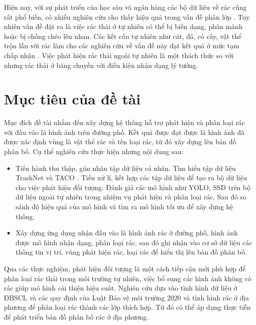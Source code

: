 \documentclass[../the.tex]{subfiles}
\begin{document}
\bigskip

{\fontsize{13}{12} \selectfont 

Hiện nay, với sự phát triển của học sâu và ngân hàng các bộ dữ liệu về rác cũng rất phổ biến, có nhiều nghiên cứu cho thấy hiệu quả trong vấn đề phân lớp \cite{yang2016classification} \cite{shah2022method} \cite{ahmad2020intelligent}. 
Tuy nhiên vấn đề đặt ra là việc rác thải ở tự nhiên có thể bị biến dạng, phân mảnh hoặc bị chồng chéo lên nhau.
Các kết cấu tự nhiên như cát, đá, cỏ cây, vật thể trộn lẫn với rác làm cho các nghiên cứu về vấn đề này đạt kết quả ở mức tạm chấp nhận \cite{Majchrowska_2022} \cite{9122693} \cite{8793975} \cite{proença2020taco}.
Việc phát hiện rác thải ngoài tự nhiên là một thách thức so với nhưng rác thải ở băng chuyền với điều kiện nhận dạng lý tưởng.

}


\section{Mục tiêu của đề tài}
\label{muc_tieu}


{\fontsize{13}{12} \selectfont

Mục đích đề tài nhắm đến xây dựng hệ thống hỗ trợ phát hiện và phân loại rác với đầu vào là hình ảnh trên đường phố. Kết quả được đạt được là hình ảnh đã được xác định vùng là vật thể rác và tên loại rác, từ đó xây dựng lên bản đồ phân bố. Cụ thể nghiên cứu thực hiện nhưng nội dung sau:

\begin{itemize}
  \item Tiến hành thu thập, gán nhãn tập dữ liệu cá nhân. Tìm hiểu tập dữ liệu TrashNet \cite{yang2016classification} và TACO \cite{proença2020taco}. Tiền xử lí, kết hợp các tập dữ liệu để tạo ra bộ dữ liệu cho việc phát hiện đối tượng.
  Đánh giá các mô hình như YOLO, SSD trên bộ dữ liệu ngoài tự nhiên trong nhiệm vụ phát hiện và phân loại rác. Sau đó so sánh độ hiệu quả của mô hình và tìm ra mô hình tối ưu để xây dựng hệ thống.
  
  \item Xây dựng ứng dụng nhận đầu vào là hình ảnh rác ở đường phố, hình ảnh được mô hình nhận dạng, phân loại rác, sau đó ghi nhận vào cơ sở dữ liệu các thông tin vị trí, vùng phát hiện rác, loại rác để hiển thị lên bản đồ phân bố.
 
\end{itemize}

}
\bigskip

{\fontsize{13}{12} \selectfont

Qua các thực nghiệm, phát hiện đối tượng là một cách tiếp cận mới phù hợp để phân loại rác thải trong môi trường tự nhiên, việc bổ sung các hình ảnh không có rác giúp mô hình cải thiện hiệu suất. Nghiên cứu dựa vào tình hình dữ liệu ở ĐBSCL và các quy định của Luật Bảo vệ môi trường 2020 và tình hình rác ở địa phương để phân loại rác thành các lớp thích hợp. Từ đó có thể áp dụng thực tiễn để phát triển bản đồ phân bố rác ở địa phương. 

}
\end{document}
